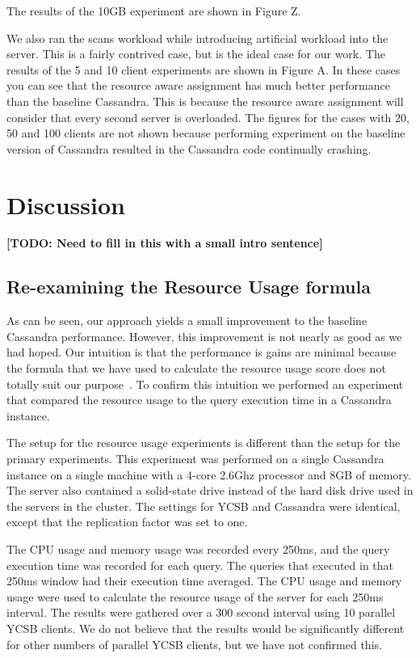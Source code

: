 \documentclass[]{acm_proc_article-sp}
\newcommand{\todo}[1]{\textbf{[TODO: #1]}}
\begin{document}
The results of the 10GB experiment are shown in Figure Z.

We also ran the scans workload while introducing artificial workload into the server. This is a fairly contrived case, but is the ideal case for our work. The results of the 5 and 10 client experiments are shown in Figure A. In these cases you can see that the resource aware assignment has much better performance than the baseline Cassandra. This is because the resource aware assignment will consider that every second server is overloaded. The figures for the cases with 20, 50 and 100 clients are not shown because performing experiment on the baseline version of Cassandra resulted in the Cassandra code continually crashing.

\section{Discussion}
\todo{Need to fill in this with a small intro sentence}

\subsection{Re-examining the Resource Usage formula}
As can be seen, our approach yields a small improvement to the baseline Cassandra performance. However, this improvement is not nearly as good as we had hoped. Our intuition is that the performance is gains are minimal because the formula that we have used to calculate the resource usage score does not totally suit our purpose~\cite{Gray and Black Box}. To confirm this intuition we performed an experiment that compared the resource usage to the query execution time in a Cassandra instance. 

The setup for the resource usage experiments is different than the setup for the primary experiments. This experiment was performed on a single Cassandra instance on a single machine with a 4-core 2.6Ghz processor and 8GB of memory. The server also contained a solid-state drive instead of the hard disk drive used in the servers in the cluster. The settings for YCSB and Cassandra were identical, except that the replication factor was set to one.

The CPU usage and memory usage was recorded every 250ms, and the query execution time was recorded for each query. The queries that executed in that 250ms window had their execution time averaged. The CPU usage and memory usage were used to calculate the resource usage of the server for each 250ms interval. The results were gathered over a 300 second interval using 10 parallel YCSB clients. We do not believe that the results would be significantly different for other numbers of parallel YCSB clients, but we have not confirmed this.
\end{document}
